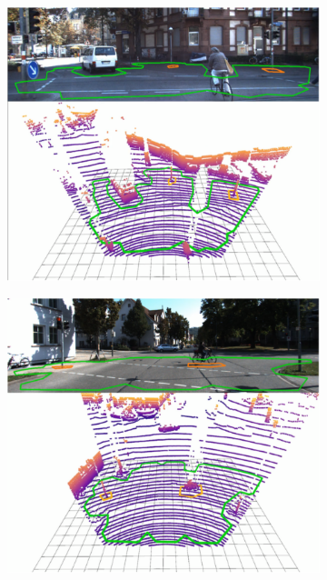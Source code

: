 \begin{figure}[ht]
    \centering
  \begin{subfigure}{.45\linewidth}
    \centering\includegraphics[clip, trim=0.1cm 0cm 0cm 0cm, width=.8\linewidth]{chapter_3_polylidar3d/imgs/kitti/kitti_results-kitti_a.pdf}
    \caption{\label{fig:ch3_kitti_a}}
  \end{subfigure}
  \hspace{0.1cm}
  \begin{subfigure}{.45\linewidth}
    \centering\includegraphics[clip, trim=0.1cm 0.1cm 0.1cm 0cm, width=.8\linewidth]{chapter_3_polylidar3d/imgs/kitti/kitti_results-kitti_d.pdf}
    \caption{\label{fig:ch3_kitti_d}}
  \end{subfigure}
   \par\bigskip
  \begin{subfigure}{.45\linewidth}

\end{subfigure}
\end{figure}
